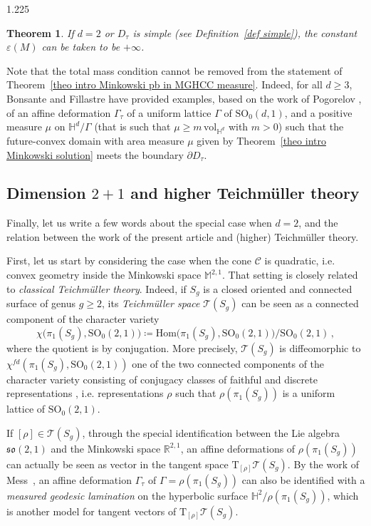 \documentclass[reqno, a4paper]{amsart}
\numberwithin{equation}{section}
\numberwithin{figure}{section}
\newtheorem{maintheorem}{Theorem}
\theoremstyle{definition}
\theoremstyle{remark}
\newcommand{\R}{\mathbb{R}} %
\newcommand{\M}{\mathbb{M}} %
\renewcommand{\H}{\mathbb{H}} %
\newcommand{\SO}{\mathrm{SO}} %
\newcommand{\C}{\mathcal{C}} %
\newcommand{\vol}{\mathrm{vol}} %
\newcommand{\bp}[1]{{\bigl( {#1} \bigr)}} %
\begin{document}
\begin{spacing}{1.225}
\begin{maintheorem}
If $d=2$ or $D_\tau$ is simple (see Definition~\ref{def simple}), the constant $\varepsilon(M)$ can be taken to be $+\infty$. 
\end{maintheorem}

Note that the total mass condition cannot be removed from the statement of Theorem~\ref{theo intro Minkowski pb in MGHCC measure}. Indeed, for all $d \geq 3$, Bonsante and Fillastre \cite[subsection 3.7]{Bonsante_Fillastre_17} have provided examples, based on the work of Pogorelov \cite{Pogorelov_78}, of an affine deformation $\Gamma_\tau$ of a uniform lattice $\Gamma$ of $\SO_0(d,1)$, and a positive measure $\mu$ on $\H^d/\Gamma$ (that is such that $\mu \geq m \, \vol_{\H^d}$ with $m>0$) such that the future-convex domain with area measure $\mu$ given by Theorem~\ref{theo intro Minkowski solution} meets the boundary $\partial D_\tau$. 

\subsection*{\texorpdfstring{Dimension $2+1$ and higher Teichm\"uller theory}{Dimension 2+1 and higher Teichm\"uller theory}}

Finally, let us write a few words about the special case when $d=2$, and the relation between the work of the present article and (higher) Teichm\"uller theory.

First, let us start by considering the case when the cone $\C$ is quadratic, i.e. convex geometry inside the Minkowski space $\M^{2,1}$. That setting is closely related to \emph{classical Teichm\"uller theory}. Indeed, if $S_g$ is a closed oriented and connected surface of genus $g \geq 2$, its \emph{Teichm\"uller space} $ \mathcal{T}(S_g)$ can be seen as a connected component of the character variety
\begin{equation*}
\chi \bp{ \pi_1(S_g) , \SO_0(2,1)} \coloneqq \text{Hom}\bp{\pi_1(S_g),\SO_0(2,1)} \big/ \SO_0(2,1) \, , 
\end{equation*}
where the quotient is by conjugation. More precisely, $ \mathcal{T}(S_g)$ is diffeomorphic to $\chi^{fd}( \pi_1(S_g) , \SO_0(2,1))$ one of the two connected components of the character variety consisting of conjugacy classes of faithful and discrete representations \cite{Goldman_thesis}, i.e. representations $\rho$ such that $\rho(\pi_1(S_g))$ is a uniform lattice of $\SO_0(2,1)$.

If $[\rho] \in \mathcal{T}(S_g)$, through the special identification between the Lie algebra $\mathfrak{so}(2,1)$ and the Minkowski space $\R^{2,1}$, an affine deformations of $\rho(\pi_1(S_g))$ can actually be seen as vector in the tangent space $\mathrm{T}_{[\rho]} \mathcal{T}(S_g)$. By the work of Mess~\cite{Mess_07,Mess_notes}, an affine deformation $\Gamma_\tau$ of $\Gamma=\rho(\pi_1(S_g))$ can also be identified with a \emph{measured geodesic lamination} on the hyperbolic surface $\H^{2}/\rho(\pi_1(S_g))$, which is another model for tangent vectors of $\mathrm{T}_{[\rho]} \mathcal{T}(S_g)$. 


\end{spacing}
\end{document}

